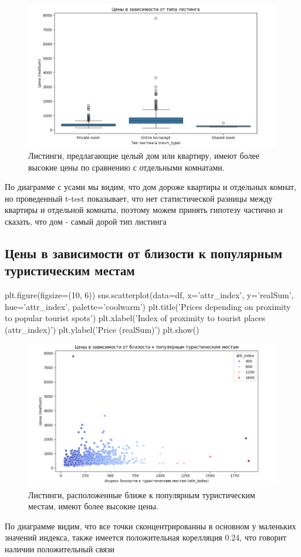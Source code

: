 \documentclass[
	11pt
] {article}
\begin{document}
	\begin{figure}[H]
		\centering
		\includegraphics[width=1.0\textwidth]{fig-06}
		\caption{Листинги, предлагающие целый дом или квартиру, имеют более высокие цены по сравнению с отдельными комнатами.}
	\end{figure}

	По диаграмме с усами мы видим, что дом дороже квартиры и отдельных комнат, но проведенный t-test показывает, что нет статистической разницы между квартиры и отдельной комнаты, поэтому можем принять гипотезу частично и сказать, что дом - самый дорой тип листинга


\subsection{Цены в зависимости от близости к популярным туристическим местам}
\begin{python}
plt.figure(figsize=(10, 6))
sns.scatterplot(data=df, x='attr_index', y='realSum', hue='attr_index', palette='coolwarm')
plt.title('Prices depending on proximity to popular tourist spots')
plt.xlabel('Index of proximity to tourist places (attr_index)')
plt.ylabel('Price (realSum)')
plt.show()
\end{python}

	\begin{figure}[H]
		\centering
		\includegraphics[width=1.0\textwidth]{fig-07}
		\caption{Листинги, расположенные ближе к популярным туристическим местам, имеют более высокие цены.}
	\end{figure}
	По диаграмме видим, что все точки сконцентрированны в основном у маленьких значений индекса, также имеется положительная корелляция 0.24, что говорит наличии положительный связи
\end{document}
